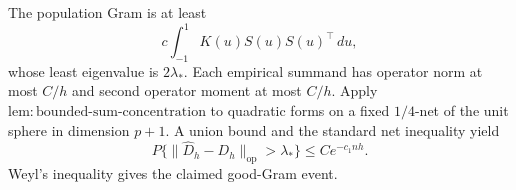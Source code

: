 The population Gram is at least
\[
c\int_{-1}^1K(u)S(u)S(u)^\top\,du,
\]
whose least eigenvalue is \(2\lambda_*\). Each empirical summand has operator norm at most \(C/h\) and second operator moment at most \(C/h\). Apply \(\mathrm{lem:bounded\text{-}sum\text{-}concentration}\) to quadratic forms on a fixed \(1/4\)-net of the unit sphere in dimension \(p+1\). A union bound and the standard net inequality yield
\[
P\{\lVert\widehat D_h-D_h\rVert_{\mathrm{op}}>\lambda_*\}\le Ce^{-c_1nh}.
\]
Weyl's inequality gives the claimed good-Gram event.